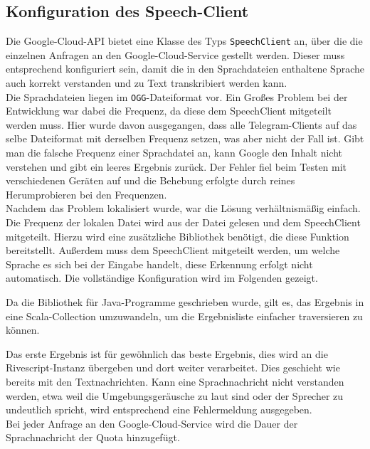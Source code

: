 \subsection{Konfiguration des Speech-Client}
Die Google-Cloud-API bietet eine Klasse des Typs \texttt{SpeechClient} an, über die die einzelnen Anfragen an den Google-Cloud-Service gestellt werden. Dieser muss entsprechend konfiguriert sein, damit die in den Sprachdateien enthaltene Sprache auch korrekt verstanden und zu Text transkribiert werden kann. \\
Die Sprachdateien liegen im \texttt{OGG}-Dateiformat vor. Ein Großes Problem bei der Entwicklung war dabei die Frequenz, da diese dem SpeechClient mitgeteilt werden muss. Hier wurde davon ausgegangen, dass alle Telegram-Clients auf das selbe Dateiformat mit derselben Frequenz setzen, was aber nicht der Fall ist. Gibt man die falsche Frequenz einer Sprachdatei an, kann Google den Inhalt nicht verstehen und gibt ein leeres Ergebnis zurück. Der Fehler fiel beim Testen mit verschiedenen Geräten auf und die Behebung erfolgte durch reines Herumprobieren bei den Frequenzen. \\
Nachdem das Problem lokalisiert wurde, war die Lösung verhältnismäßig einfach. Die Frequenz der lokalen Datei wird aus der Datei gelesen und dem SpeechClient mitgeteilt. Hierzu wird eine zusätzliche Bibliothek benötigt, die diese Funktion bereitstellt. Außerdem muss dem SpeechClient mitgeteilt werden, um welche Sprache es sich bei der Eingabe handelt, diese Erkennung erfolgt nicht automatisch. Die vollständige Konfiguration wird im Folgenden gezeigt.



Da die Bibliothek für Java-Programme geschrieben wurde, gilt es, das Ergebnis in eine Scala-Collection umzuwandeln, um die Ergebnisliste einfacher traversieren zu können.

Das erste Ergebnis ist für gewöhnlich das beste Ergebnis, dies wird an die Rivescript-Instanz übergeben und dort weiter verarbeitet. Dies geschieht wie bereits mit den Textnachrichten. 
Kann eine Sprachnachricht nicht verstanden werden, etwa weil die Umgebungsgeräusche zu laut sind oder der Sprecher zu undeutlich spricht, wird entsprechend eine Fehlermeldung ausgegeben. \\
Bei jeder Anfrage an den Google-Cloud-Service wird die Dauer der Sprachnachricht der Quota hinzugefügt.
